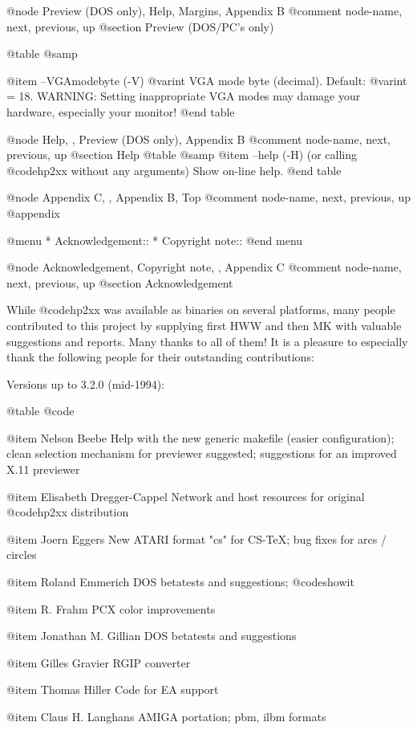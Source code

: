 @node Preview (DOS only), Help, Margins, Appendix B
@comment  node-name,  next,  previous,  up
@section  Preview (DOS/PC's only)

@table @samp

@item --VGAmodebyte (-V) @var{int}
VGA mode byte (decimal). Default: @var{int} = 18.
WARNING: Setting inappropriate VGA modes may damage your hardware,
especially your monitor!
@end table


@node Help, , Preview (DOS only), Appendix B
@comment  node-name,  next,  previous,  up
@section  Help
@table @samp
@item --help (-H)
(or calling @code{hp2xx} without any arguments)  Show on-line help.
@end table



@node Appendix C, , Appendix B, Top
@comment  node-name,  next,  previous,  up
@appendix

@menu
* Acknowledgement::
* Copyright note::
@end menu


@node Acknowledgement, Copyright note, , Appendix C
@comment  node-name,  next,  previous,  up
@section Acknowledgement

While @code{hp2xx} was available as binaries on several platforms,
many people contributed to this project by supplying first HWW and then MK 
with valuable suggestions and reports. Many thanks to all of them!
It is a pleasure to especially thank the following people for their
outstanding contributions:

Versions up to 3.2.0 (mid-1994):

@table @code

@item Nelson Beebe
Help with the new generic makefile (easier configuration);
clean selection mechanism for previewer suggested;
suggestions for an improved X.11 previewer

@item Elisabeth Dregger-Cappel
Network and host resources for original @code{hp2xx} distribution

@item Joern Eggers
New ATARI format "cs" for CS-TeX; bug fixes for arcs / circles

@item Roland Emmerich
DOS betatests and suggestions; @code{showit}

@item R. Frahm
PCX color improvements

@item Jonathan M. Gillian
DOS betatests and suggestions

@item Gilles Gravier
RGIP converter

@item Thomas Hiller
Code for EA support

@item Claus H. Langhans
AMIGA portation; pbm, ilbm formats

